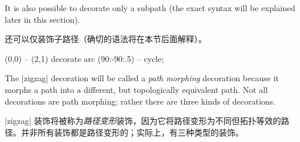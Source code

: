It is also possible to decorate only a subpath (the exact syntax will be
explained later in this section).

还可以仅装饰子路径（确切的语法将在本节后面解释）。


\begin{codeexample}[preamble={\usetikzlibrary{decorations.pathmorphing}}]
\tikz \fill [decoration={zigzag}]
  [fill=blue!20,draw=blue,thick] (0,0) -- (2,1)
    decorate { arc (90:-90:.5) } -- cycle;
\end{codeexample}

The |zigzag| decoration will be called a \emph{path morphing} decoration
because it morphs a path into a different, but topologically equivalent path.
Not all decorations are path morphing; rather there are three kinds of
decorations.

|zigzag| 装饰将被称为\emph{路径变形}装饰，因为它将路径变形为不同但拓扑等效的路径。并非所有装饰都是路径变形的；实际上，有三种类型的装饰。

